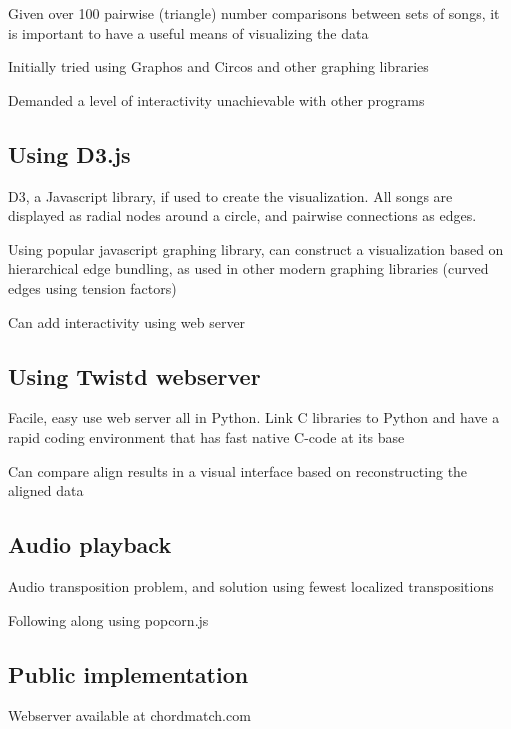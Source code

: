 \item Given over 100 pairwise (triangle) number comparisons between sets of songs, it is important to have a useful means of visualizing the data

\item Initially tried using Graphos and Circos and other graphing libraries

\item Demanded a level of interactivity unachievable with other programs

\subsection{Using D3.js}

D3, a Javascript library, if used to create the visualization. All songs are displayed as radial nodes around a circle, and pairwise connections as edges.

\item Using popular javascript graphing library, can construct a visualization based on hierarchical edge bundling, as used in other modern graphing libraries (curved edges using tension factors)

\item Can add interactivity using web server

\subsection{Using Twistd webserver}

\item Facile, easy use web server all in Python. Link C libraries to Python and have a rapid coding environment that has fast native C-code at its base

\item Can compare align results in a visual interface based on reconstructing the aligned data

\subsection{Audio playback}

\item Audio transposition problem, and solution using fewest localized transpositions

\item Following along using popcorn.js

\subsection{Public implementation}

\item Webserver available at chordmatch.com